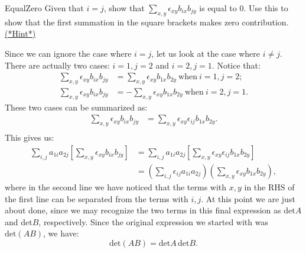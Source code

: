 \begin{exercise}{EqualZero}
Given that $i=j$, show that $\sum_{x,y} \epsilon_{xy}  b_{ix}b_{jy}$  is equal to 0. Use this to show that the first summation in the square brackets makes zero contribution. \hyperref[sec:SigmaNotation:Hints]{(*Hint*)} 
\end{exercise}
Since we can ignore the case where $i=j$, let us look at the case where $i \neq j$.  There are actually two cases: $i=1, j=2$ and $i=2, j=1$.  Notice that:
\begin{align*}
 \sum_{x,y}\epsilon_{xy} b_{ix}b_{jy}&= \sum_{x,y} \epsilon_{xy} b_{1x}b_{2y}~\text{when}~i=1,j=2;\\
\sum_{x,y} \epsilon_{xy} b_{ix}b_{jy}&= - \sum_{x,y}\epsilon_{xy} b_{1x}b_{2y}~\text{when}~i=2,j=1.
\end{align*}
These two cases can be summarized as:
\begin{align*}
\sum_{x,y} \epsilon_{xy} b_{ix}b_{jy}&=\sum_{x,y}\epsilon_{xy}\epsilon_{ij} b_{1x}b_{2y}.\\
\end{align*}
This gives us:
\begin{align*}
 \sum_{i,j}  a_{1i}a_{2j} \left[\sum_{x,y} \epsilon_{xy} b_{ix}b_{jy}\right]&=  \sum_{i,j}  a_{1i}a_{2j} \left[\sum_{x,y} \epsilon_{xy} \epsilon_{ij} b_{1x}b_{2y}\right]\\
&=  \left(\sum_{i,j}\epsilon_{ij}   a_{1i}a_{2j}\right)\left(\sum_{x,y}  \epsilon_{xy} b_{1x}b_{2y}\right),
\end{align*}
where in the second line we have noticed that the terms with $x,y$ in the RHS of the first line can be separated from the terms with $i,j$.
At this point we are just about done, since we may recognize the two terms in this final expression as $\text{det} A$ and $\text{det} B$, respectively.
Since the original expression we started with was $\text{det}(AB)$, we have:
\[
\text{det}(AB)= \text{det}A \,\text{det}B.
\]

